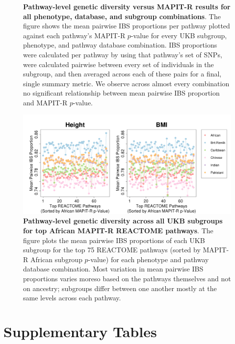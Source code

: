 \documentclass[12pt,a4paper]{article}
\begin{document}
\begin{figure} [t!]
\caption[TBD]{\textbf{Pathway-level genetic diversity versus MAPIT-R results for all phenotype, database, and subgroup combinations}. The figure shows the mean pairwise IBS proportions per pathway plotted against each pathway's MAPIT-R $p$-value for every UKB subgroup, phenotype, and pathway database combination. IBS proportions were calculated per pathway by using that pathway's set of SNPs, were calculated pairwise between every set of individuals in the subgroup, and then averaged across each of these pairs for a final, single summary metric. We observe across almost every combination no significant relationship between mean pairwise IBS proportion and MAPIT-R $p$-value.}
\label{InterPath-Supp-Figure-IBS-AllPops-Caption}
\end{figure}
\clearpage

\begin{figure}[htbp]
\centering
\includegraphics[scale=.35]{Images/Supp/InterPath_Supp_Figure_IBS_AllPopComps_vs3_REACTOME.png}
\caption[TBD]{\textbf{Pathway-level genetic diversity across all UKB subgroups for top African MAPIT-R REACTOME pathways}. The figure plots the mean pairwise IBS proportions of each UKB subgroup for the top 75 REACTOME pathways (sorted by MAPIT-R African subgroup $p$-value) for each phenotype and pathway database combination. Most variation in mean pairwise IBS proportions varies moreso based on the pathways themselves and not on ancestry; subgroups differ between one another mostly at the same levels across each pathway.}
\label{InterPath-Supp-Figure-IBS-AllPopComps-REACTOME}
\end{figure}
\clearpage

\section{Supplementary Tables}\label{Supplementary-Tables}
\end{document}
